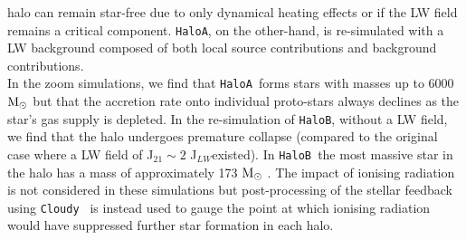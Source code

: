\documentclass[graphics, twocolumn, usenatbib]{mn2e}
\newcommand{\cloudy}{\texttt{Cloudy~}}
\newcommand{\msolar} {$\rm{M_{\odot}}~$}
\newcommand{\JLW} {J$_{LW}$}
\newcommand{\ha} {\texttt{HaloA~}}
\newcommand{\hb} {\texttt{HaloB~}}
\newcommand{\hac} {\texttt{HaloA}}
\newcommand{\hbc} {\texttt{HaloB}}
\begin{document}
  halo can remain star-free due to only dynamical heating effects or if the LW field 
  remains a critical component. \hac, on the other-hand, is re-simulated with a LW background
  composed of both local source contributions and background contributions. \\
  \indent In the zoom simulations, we find that \ha forms stars with masses up to 6000 \msolar but that the accretion
  rate onto individual proto-stars always declines as the star's gas supply is depleted. In the
  re-simulation of \hbc, without a LW field, we find that the halo undergoes premature collapse
  (compared to the original case where a LW field of J$_{21} \sim 2$ \JLW existed). In \hb the
  most massive star in the halo has a mass of approximately 173 \msolar. The impact of ionising
  radiation is not considered in these simulations but post-processing of the stellar feedback
  using \cloudy \citep{Ferland_2017} is instead used to gauge the point at which ionising radiation
  would have suppressed further star formation in each halo. 
  
\end{document}

